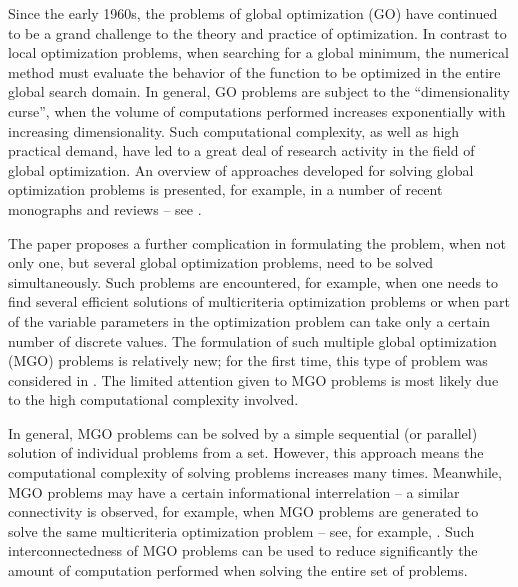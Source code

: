 \documentclass[review]{elsarticle}
\begin{document}
\cite{c1,c2,c3,c4,c5,c6,c7,c8,c9,c10}
\cite{c11,c12,c13,c14,c15,c16,c17,c18,c19,c20}
\cite{c21,c22,c23,c24,c25,c26,c27,c28,c29,c30}
\cite{c31,c32,c33,c34,c35,c36,c37,c38,c39,c40,c41}


Since the early 1960s, the problems of global optimization (GO) have continued to be a grand challenge to the theory and practice of optimization. In contrast to local optimization problems, when searching for a global minimum, the numerical method must evaluate the behavior of the function to be optimized in the entire global search domain. In general, GO problems are subject to the ``dimensionality curse'', when the volume of computations performed increases exponentially with increasing dimensionality. Such computational complexity, as well as high practical demand, have led to a great deal of research activity in the field of global optimization. An overview of approaches developed for solving global optimization problems is presented, for example, in a number of recent monographs and reviews -- see \cite{c1,c2,c3,c4,c5,c6,c7,c8,c9}.

The paper proposes a further complication in formulating the problem, when not only one, but several global optimization problems, need to be solved simultaneously. Such problems are encountered, for example, when one needs to find several efficient solutions of multicriteria optimization problems or when part of the variable parameters in the optimization problem can take only a certain number of discrete values. The formulation of such multiple global optimization (MGO) problems is relatively new; for the first time, this type of problem was considered in \cite{c15,c16,c17}. The limited attention given to MGO problems is most likely due to the high computational complexity involved.

In general, MGO problems can be solved by a simple sequential (or parallel) solution of individual problems from a set. However, this approach means the computational complexity of solving problems increases many times. Meanwhile, MGO problems may have a certain informational interrelation -- a similar connectivity is observed, for example, when MGO problems are generated to solve the same multicriteria optimization problem -- see, for example, \cite{c19,c20}. Such interconnectedness of MGO problems can be used to reduce significantly the amount of computation performed when solving the entire set of problems.
\end{document}
